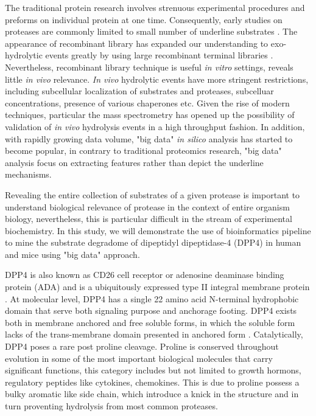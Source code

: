 The traditional protein research involves strenuous experimental procedures and preforms on individual protein at one time. Consequently, early studies on proteases are commonly limited to small number of underline substrates \cite{:1992aa}. The appearance of recombinant library has expanded our understanding to exo-hydrolytic events greatly by using large recombinant terminal libraries \cite{Gupta:2010aa}. Nevertheless, recombinant library technique is useful \textit{in vitro} settings, reveals little \textit{in vivo} relevance. \textit{In vivo} hydrolytic events have more stringent restrictions, including subcellular localization of substrates and proteases, subcelluar concentrations, presence of various chaperones etc. Given the rise of modern techniques, particular the mass spectrometry has opened up the possibility of validation of \textit{in vivo} hydrolysis events in a high throughput fashion. In addition, with rapidly growing data volume, "big data" \textit{in silico} analysis has started to become popular, in contrary to traditional proteomics research, "big data" analysis focus on extracting features rather than depict the underline mechanisms. 

Revealing the entire collection of substrates of a given protease is important to understand biological relevance of protease in the context of entire organism biology, nevertheless, this is particular difficult in the stream of experimental biochemistry. In this study, we will demonstrate the use of bioinformatics pipeline to mine the substrate degradome of dipeptidyl dipeptidase-4 (DPP4) in human and mice using "big data" approach. 

DPP4 is also known as CD26 cell receptor or adenosine deaminase binding protein (ADA) and is a ubiquitously expressed type II integral membrane protein \cite{Mentlein_1999}. At molecular level, DPP4 has a single 22 amino acid N-terminal hydrophobic domain that serve both signaling purpose and anchorage footing. \cite{Mentlein_1999, Abbott_2002} DPP4 exists both in membrane anchored and free soluble forms, in which the soluble form lacks of the trans-membrane domain presented in anchored form \cite{Lambeir:2001ab,Abbott:2000qr}. Catalytically, DPP4 poses a rare post proline cleavage. Proline is conserved throughout evolution in some of the most important biological molecules that carry significant functions, this category includes but not limited to growth hormons, regulatory peptides like cytokines, chemokines. This is due to proline possess a bulky aromatic like side chain, which introduce a knick in the structure and in turn proventing hydrolysis from most common proteases. 